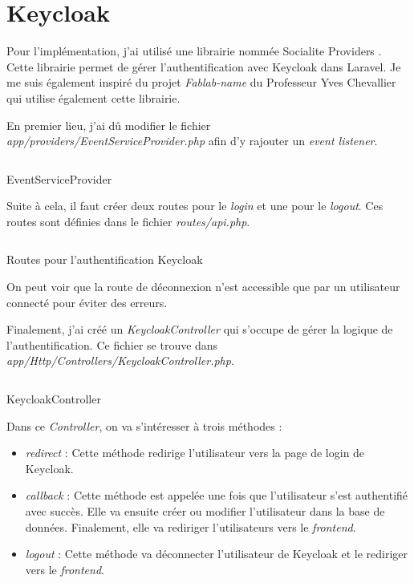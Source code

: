 \section{Keycloak}
Pour l'implémentation, j'ai utilisé une librairie nommée Socialite Providers \cite{SocialiteProviders}. Cette librairie permet de gérer l'authentification avec Keycloak dans Laravel. Je me suis également inspiré du projet \emph{Fablab-name} \cite{FablabName} du Professeur Yves Chevallier qui utilise également cette librairie.

En premier lieu, j'ai dû modifier le fichier \emph{app/providers/EventServiceProvider.php} afin d'y rajouter un \emph{event listener}.
\begin{listing}[H]
    \inputminted{php}{assets/code/serviceProviderkeycloak.php}
    \caption{EventServiceProvider \label{serviceProviderkeycloak}}
\end{listing}

Suite à cela, il faut créer deux routes pour le \emph{login} et une pour le \emph{logout}. Ces routes sont définies dans le fichier \emph{routes/api.php}.

\begin{listing}[H]
    \inputminted{php}{assets/code/routeKeycloak.php}
    \caption{Routes pour l'authentification Keycloak \label{routeKeycloak}}
\end{listing}

On peut voir que la route de déconnexion n'est accessible que par un utilisateur connecté pour éviter des erreurs.

Finalement, j'ai créé un \emph{KeycloakController} qui s'occupe de gérer la logique de l'authentification. Ce fichier se trouve dans \emph{app/Http/Controllers/KeycloakController.php}.

\begin{listing}[H]
    \inputminted{php}{assets/code/keycloakController.php}
    \caption{KeycloakController \label{keycloakController}}
\end{listing}

Dans ce \emph{Controller}, on va s'intéresser à trois méthodes :
\begin{itemize}
    \item \emph{redirect} : Cette méthode redirige l'utilisateur vers la page de login de Keycloak.
    \item \emph{callback} : Cette méthode est appelée une fois que l'utilisateur s'est authentifié avec succès. Elle va ensuite créer ou modifier l'utilisateur dans la base de données. Finalement, elle va rediriger l'utilisateurs vers le \emph{frontend}.
    \item \emph{logout} : Cette méthode va déconnecter l'utilisateur de Keycloak et le rediriger vers le \emph{frontend}.
\end{itemize}

